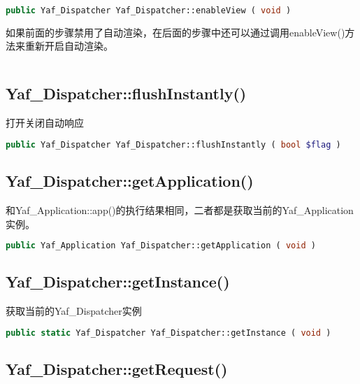 \begin{lstlisting}[language=PHP]
public Yaf_Dispatcher Yaf_Dispatcher::enableView ( void )
\end{lstlisting}

如果前面的步骤禁用了自动渲染，在后面的步骤中还可以通过调用enableView()方法来重新开启自动渲染。

\begin{lstlisting}[language=PHP]

\end{lstlisting}
\subsection{Yaf\_Dispatcher::flushInstantly()}

打开关闭自动响应

\begin{lstlisting}[language=PHP]
public Yaf_Dispatcher Yaf_Dispatcher::flushInstantly ( bool $flag )
\end{lstlisting}


\subsection{Yaf\_Dispatcher::getApplication()}

和Yaf\_Application::app()的执行结果相同，二者都是获取当前的Yaf\_Application实例。


\begin{lstlisting}[language=PHP]
public Yaf_Application Yaf_Dispatcher::getApplication ( void )
\end{lstlisting}






\subsection{Yaf\_Dispatcher::getInstance()}


获取当前的Yaf\_Dispatcher实例

\begin{lstlisting}[language=PHP]
public static Yaf_Dispatcher Yaf_Dispatcher::getInstance ( void )
\end{lstlisting}



\subsection{Yaf\_Dispatcher::getRequest()}


